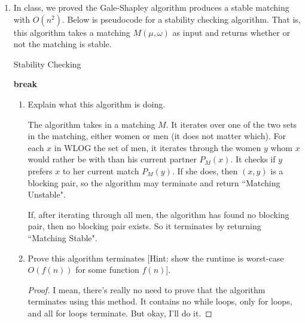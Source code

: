 \documentclass[10pt]{article}
\newcommand{\algorithmicbreak}{\textbf{break}}
\begin{document}
\begin{enumerate}
\begin{proof}
Since woman 1 is still free, we continue.  She proposes to the next on her list, which is 2.  2 prefers 1 to his current match, which is 2, thus he accepts and woman 2 becomes free.  The matching is now $\{(1,3),(2,1)\}$.

In the final iteration, 2 proposes to 3.  3 is free, so he accepts.  Thus, the final matching is $\{(1,3),(2,1),(3,2)\}$.
\end{proof}

\item In class, we proved the Gale-Shapley  algorithm produces a stable matching with $O(n^2)$.  Below is pseudocode for a stability checking algorithm.  That is, this algorithm takes a matching $M(\mu, \omega)$ as input and returns whether or not the matching is stable.


\renewcommand{\thealgorithm}{}
\begin{algorithm}
\caption{Stability Checking}
\begin{algorithmic}
			\algorithmicbreak
		\EndIf
		\EndFor
	\EndFor
\EndFunction
\end{algorithmic}
\end{algorithm}

\begin{enumerate}
\item Explain what this algorithm is doing.

The algorithm takes in a matching $M$.  It iterates over one of the two sets in the matching, either women or men (it does not matter which).  For each $x$ in WLOG the set of men, it iterates through the women $y$ whom $x$ would rather be with than his current partner $P_M(x)$.  It checks if $y$ prefers $x$ to her current match $P_M(y)$.  If she does, then $(x,y)$ is a blocking pair, so the algorithm may terminate and return ``Matching Unstable".

If, after iterating through all men, the algorithm has found no blocking pair, then no blocking pair exists.  So it terminates by returning ``Matching Stable".

\item Prove this algorithm terminates [Hint: show the runtime is worst-case $O(f(n))$ for some function $f(n)$].

\begin{proof}
I mean, there's really no need to prove that the algorithm terminates using this method.  It contains no while loops, only for loops, and all for loops terminate.  But okay, I'll do it.


\end{proof}
\end{enumerate}
\end{enumerate}
\end{document}
